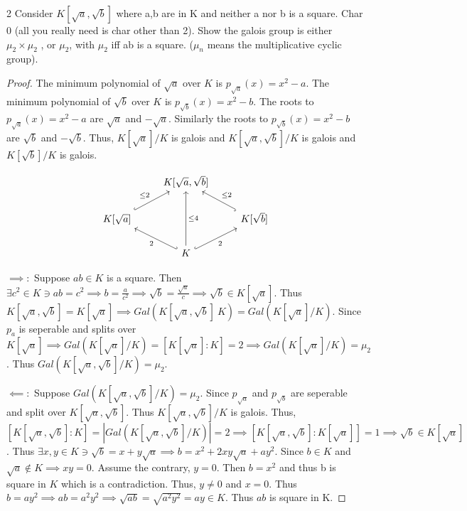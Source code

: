 \documentclass{article}
\begin{document}
\begin{PROB}{2}\label{Problem 2.}
    Consider $K[\sqrt{a}, \sqrt{b}]$  where a,b are in K and neither a nor b is a square.  Char 0 (all you really need is char other than 2).  Show the galois group is either $\mu_2 \times \mu_2$ , or $\mu_2$, with $\mu_2$ iff ab is a square. ($\mu_n$ means the multiplicative cyclic group). 
\end{PROB}
\begin{proof}
    The minimum polynomial of $\sqrt{a}$ over $K$ is $p_{\sqrt{a}}(x) = x^2 - a$. The minimum polynomial of $\sqrt{b}$ over $K$ is $p_{\sqrt{b}}(x) = x^2 - b$. The roots to $p_{\sqrt{a}}(x) = x^2 - a$ are $\sqrt{a}$ and $-\sqrt{a}$. Similarly the roots to $p_{\sqrt{b}}(x) = x^2 - b$ are $\sqrt{b}$ and $-\sqrt{b}$. Thus, $K[\sqrt{a}] / K$ is galois and $K[\sqrt{a}, \sqrt{b}] / K$ is galois and $K[\sqrt{b}] / K$ is galois.   
    
    \[\begin{tikzcd}
        & {K[\sqrt{a}, \sqrt{b}]} \\
        {K[\sqrt{a}]} && {K[\sqrt{b}]} \\
        & K
        \arrow["{\leq 2}", hook, from=2-1, to=1-2]
        \arrow["{\leq 2}"', hook, from=2-3, to=1-2]
        \arrow["{\leq 4}"', from=3-2, to=1-2]
        \arrow["2", hook', from=3-2, to=2-1]
        \arrow["2"', hook, from=3-2, to=2-3]
    \end{tikzcd}\]

    $\implies:$ Suppose $ab \in K$ is a square. Then $\exists c^2 \in K \ni ab = c^2 \implies b = \frac{a}{c^2} \implies \sqrt{b} = \frac{\sqrt{a}}{c} \implies \sqrt{b} \in K[\sqrt{a}]$. Thus $K[\sqrt{a}, \sqrt{b}] = K[\sqrt{a}] \implies Gal(K[\sqrt{a}, \sqrt{b}] \ K) = Gal(K[\sqrt{a}] / K)$. Since $p_a$ is seperable and splits over $K[\sqrt{a}] \implies Gal(K[\sqrt{a}] / K) = [K[\sqrt{a}] : K] = 2 \implies Gal(K[\sqrt{a}] / K) = \mu_2$. Thus $Gal(K[\sqrt{a}, \sqrt{b}] / K) = \mu_2 $. 
    
    $\impliedby: $ Suppose $Gal(K[\sqrt{a}, \sqrt{b}] / K) = \mu_2$. Since $p_{\sqrt{a}}$ and $p_{\sqrt{b}}$ are seperable and split over $K[\sqrt{a}, \sqrt{b}]$. Thus $K[\sqrt{a}, \sqrt{b}] / K$ is galois. Thus, $[K[\sqrt{a}, \sqrt{b}] : K] = |Gal(K[\sqrt{a}, \sqrt{b}] / K)| = 2 \implies [K[\sqrt{a}, \sqrt{b}] : K[\sqrt{a}]] = 1 \implies \sqrt{b} \in K[\sqrt{a}]$. Thus $\exists x, y \in K \ni \sqrt{b} = x + y \sqrt{a} \implies b = x^2 + 2xy\sqrt{a} + ay^2$. Since $b \in K$ and $\sqrt{a} \not \in K \implies xy = 0$. Assume the contrary, $y = 0$. Then $b = x^2$ and thus b is square in $K$ which is a contradiction. Thus, $y \neq 0$ and $x = 0$. Thus $b = ay^2 \implies ab =a^2y^2 \implies \sqrt{ab} = \sqrt{a^2 y^2} = ay \in K$. Thus $ab$ is square in K. 
    

\end{proof}
\end{document}
